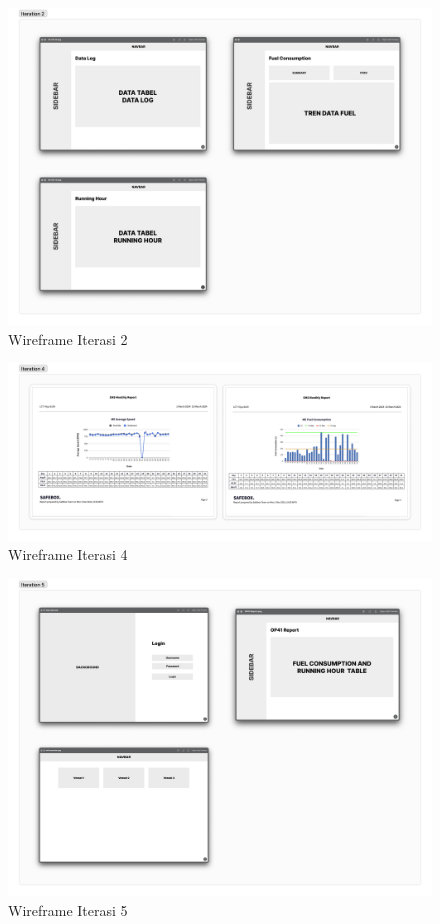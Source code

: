 \begin{landscape}
    \begin{figure}[!h]
        \includegraphics[width=.7\linewidth, center]{images/lampiran/wireframe/wire-it2.png}
        \caption{Wireframe Iterasi 2}
        \label{fig:wire-it2}
    \end{figure}

    \begin{figure}[!h]
        \includegraphics[width=1\linewidth, center]{images/lampiran/wireframe/wire-it4.png}
        \caption{Wireframe Iterasi 4}
        \label{fig:wire-it4}
    \end{figure}

    \begin{figure}[!h]
        \includegraphics[width=.7\linewidth, center]{images/lampiran/wireframe/wire-it5.png}
        \caption{Wireframe Iterasi 5}
        \label{fig:wire-it5}
    \end{figure}


\end{landscape}
